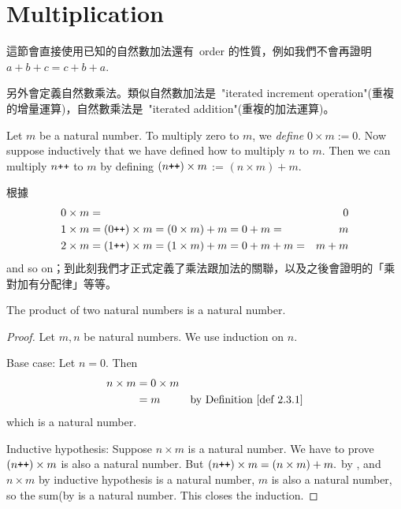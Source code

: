 \section{Multiplication}\label{sec 2.3}

\newcommand{\X}{\times}

\begin{note}
這節會直接使用已知的自然數加法還有\ order 的性質，例如我們不會再證明\ \(a + b + c = c + b + a\).

另外會定義自然數乘法。類似自然數加法是\ "iterated increment operation"(重複的增量運算)，自然數乘法是\ "iterated addition"(重複的加法運算)。
\end{note}

\begin{definition}\label{def 2.3.1} Let \(m\) be a natural number. To multiply zero to \(m\), we \emph{define} \(0 \X m := 0\). Now suppose inductively that we have defined how to multiply \(n\) to \(m\). Then we can multiply \(n\texttt{++}\) to \(m\) by defining \((n\INC) \X m\) := \((n \X m) + m\).
\end{definition}

\begin{note}
根據\ 
    \begin{align*}
    0 \X m & = & 0 \\
    1 \X m & = (0\INC) \X m = (0 \X m) + m = 0 + m = & m \\
    2 \X m & = (1\INC) \X m = (1 \X m) + m = 0 + m + m = & m + m
    \end{align*}
and so on；到此刻我們才正式定義了乘法跟加法的關聯，以及之後會證明的「乘對加有分配律」等等。
\end{note}

\begin{additional corollary} \label{ac 2.3.1}
The product of two natural numbers is a natural number.
\end{additional corollary}
\begin{proof}
Let \(m, n\) be natural numbers. We use induction on \(n\).

Base case: Let \(n = 0\). Then
\begin{align*}
    n \X m & = 0 \X m & \\
           & = m      & \text{by \DEF{2.3.1}}
\end{align*}
which is a natural number.

Inductive hypothesis: Suppose \(n \X m\) is a natural number. We have to prove \((n\INC) \X m\) is also a natural number. But \((n\INC) \X m = (n \X m) + m.\) by , and \(n \X m\) by inductive hypothesis is a natural number, \(m\) is also a natural number, so the sum(by  is a natural number. This closes the induction.
\end{proof}

